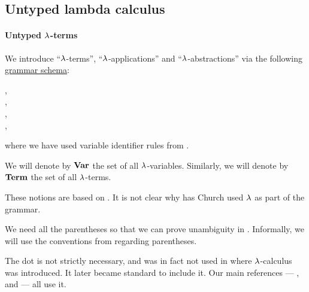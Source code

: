 \subsection{Untyped lambda calculus}\label{subsec:untyped_lambda_calculus}

\paragraph{Untyped \( \synlambda \)-terms}

\begin{definition}\label{def:lambda_term}\mimprovised
  We introduce \enquote{\( \synlambda \)-terms}, \enquote{\( \synlambda \)-applications} and \enquote{\( \synlambda \)-abstractions} via the following \hyperref[def:formal_grammar/schema]{grammar schema}:
  \begin{bnf*}
        {}, \\
     {\bnftsq{\( ( \)} \bnfsp {} \bnfsp {} \bnfsp \bnftsq{\( ) \)}}, \\
     {\bnftsq{\( ( \)} \bnfsp \bnftsq{\( \synlambda \)} \bnfsp {} \bnfsp {} \bnfsp {} \bnfsp \bnftsq{\( ) \)}}, \\
            { \bnfor {} \bnfor {}},
  \end{bnf*}
  where we have used variable identifier rules from .

  \begin{thmenum}
     We will denote by \( \op*{Var} \) the set of all \( \synlambda \)-variables.
     Similarly, we will denote by \( \op*{Term} \) the set of all \( \synlambda \)-terms.
  \end{thmenum}
\end{definition}
\begin{comments}
  \item These notions are based on \cite[352]{Church1932}. It is not clear why has Church used \( \synlambda \) as part of the grammar.

  \item We need all the parentheses so that we can prove unambiguity in . Informally, we will use the conventions from  regarding parentheses.

  \item The dot is not strictly necessary, and was in fact not used in  where \( \synlambda \)-calculus was introduced. It later became standard to include it. Our main references --- ,  and  --- all use it.
\end{comments}

